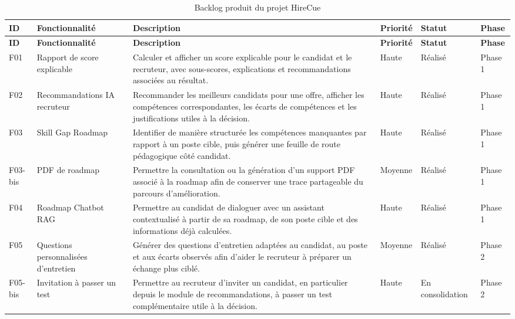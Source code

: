 \small
\renewcommand{\arraystretch}{1.2}
\setlength{\tabcolsep}{3pt}
\setlength{\LTpre}{0pt}
\setlength{\LTpost}{0pt}
\begin{longtable}{|p{0.85cm}|p{2.8cm}|p{4.9cm}|p{1.65cm}|p{1.55cm}|p{1.25cm}|}
\caption{Backlog produit du projet HireCue} \\
\hline
\rowcolor{TableHeaderBlue}
\textbf{ID} & \textbf{Fonctionnalité} & \textbf{Description} & \textbf{Priorité} & \textbf{Statut} & \textbf{Phase} \\
\hline
\endfirsthead

\hline
\rowcolor{TableHeaderBlue}
\textbf{ID} & \textbf{Fonctionnalité} & \textbf{Description} & \textbf{Priorité} & \textbf{Statut} & \textbf{Phase} \\
\hline
\endhead

F01 & Rapport de score explicable & Calculer et afficher un score explicable pour le candidat et le recruteur, avec sous-scores, explications et recommandations associées au résultat. & Haute & Réalisé & Phase 1 \\
\hline
F02 & Recommandations IA recruteur & Recommander les meilleurs candidats pour une offre, afficher les compétences correspondantes, les écarts de compétences et les justifications utiles à la décision. & Haute & Réalisé & Phase 1 \\
\hline
F03 & Skill Gap Roadmap & Identifier de manière structurée les compétences manquantes par rapport à un poste cible, puis générer une feuille de route pédagogique côté candidat. & Haute & Réalisé & Phase 1 \\
\hline
F03-bis & PDF de roadmap & Permettre la consultation ou la génération d'un support PDF associé à la roadmap afin de conserver une trace partageable du parcours d'amélioration. & Moyenne & Réalisé & Phase 1 \\
\hline
F04 & Roadmap Chatbot RAG & Permettre au candidat de dialoguer avec un assistant contextualisé à partir de sa roadmap, de son poste cible et des informations déjà calculées. & Haute & Réalisé & Phase 1 \\
\hline
F05 & Questions personnalisées d'entretien & Générer des questions d'entretien adaptées au candidat, au poste et aux écarts observés afin d'aider le recruteur à préparer un échange plus ciblé. & Moyenne & Réalisé & Phase 2 \\
\hline
F05-bis & Invitation à passer un test & Permettre au recruteur d'inviter un candidat, en particulier depuis le module de recommandations, à passer un test complémentaire utile à la décision. & Haute & En consolidation & Phase 2 \\

\end{longtable}
